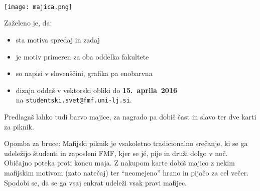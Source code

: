 \documentclass[a4paper,oneside,12pt]{article}
\title{\Title}
\author{\Author}
\date{\today}
\theoremstyle{definition}
\newcommand{\veliko}[1]{\scalebox{4}{#1}}
\newcommand{\srednje}[1]{\scalebox{2.5}{#1}}
\begin{document}
\srednje{ŠS in ŠO FMF razpisujeta natečaj}

\setlength{\baselineskip}{40pt}
\vspace{-45pt}

\begin{center}
  \srednje{za} \\
  \veliko{\bf dizajn majice} \\
  \srednje{za} \\[10pt]
  \veliko{\bf Mafijski piknik 2016!}

  \texttt{[image: majica.png]}
\end{center}

\fontsize{24}{26}\selectfont

\vspace{-55pt}
Zaželeno je, da:
\vspace{-35pt}
\begin{itemize}
  \item sta motiva spredaj in zadaj
  \item je motiv primeren za oba oddelka fakultete
  \item so napisi v slovenščini, grafika pa enobarvna
  \item dizajn oddaš v vektorski obliki do \textbf{15.~aprila~2016} \\[5pt]
        na \texttt{studentski.svet@fmf.uni-lj.si}.
\end{itemize}
\vspace{-25pt}
Predlagaš lahko tudi barvo majice, za nagrado pa dobiš čast in slavo ter dve karti za piknik.

\fontsize{10}{11}\selectfont
Opomba za bruce: Mafijski piknik je vsakoletno tradicionalno srečanje, ki se ga
udeležijo študenti in zaposleni FMF, kjer se j\'{e}, pije in druži dolgo v noč.
Običajno poteka proti koncu maja. Z nakupom karte dobiš majico z nekim mafijskim
motivom (zato natečaj) ter ``neomejeno'' hrano in pijačo za cel večer. Spodobi se,
da se ga vsaj enkrat udeleži vsak pravi mafijec.
\end{document}
